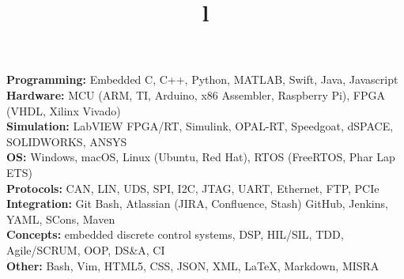 \documentclass[mm]{res}
\begin{document}



\begin{resume}

\npspctoprule
\section{\headingskills}
\tb \textbf{Programming:} Embedded C, C++, Python, MATLAB, Swift, Java, Javascript\\
\tb \textbf{Hardware:} MCU (ARM, TI, Arduino, x86 Assembler, Raspberry Pi), FPGA (VHDL, Xilinx Vivado)\\
\tb \textbf{Simulation:} LabVIEW FPGA/RT, Simulink, OPAL-RT, Speedgoat, dSPACE, SOLIDWORKS, ANSYS\\
\tb \textbf{OS:} Windows, macOS, Linux (Ubuntu, Red Hat), RTOS (FreeRTOS, Phar Lap ETS)\\
\tb \textbf{Protocols:} CAN, LIN, UDS, SPI, I2C, JTAG, UART, Ethernet, FTP, PCIe\\
\tb \textbf{Integration:} Git Bash, Atlassian (JIRA, Confluence, Stash) GitHub, Jenkins, YAML, SCons, Maven\\
\tb \textbf{Concepts:} embedded discrete control systems, DSP, HIL/SIL, TDD, Agile/SCRUM, OOP, DS\&A, CI\\
\tb \textbf{Other:} Bash, Vim, HTML5, CSS, JSON, XML, \LaTeX, Markdown, MISRA\xspace


\toprule

\section{\headingeducation}
\begin{format}
\\
\title{l}\\
\end{format}


\end{resume}
\end{document}
